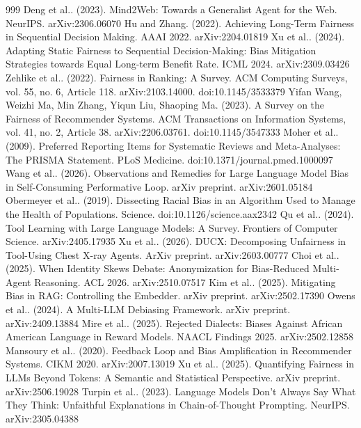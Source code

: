 \documentclass[10pt]{article}
\begin{document}
\begin{thebibliography}{999}
 Deng et al.. (2023). Mind2Web: Towards a Generalist Agent for the Web. NeurIPS. arXiv:2306.06070
 Hu and Zhang. (2022). Achieving Long-Term Fairness in Sequential Decision Making. AAAI 2022. arXiv:2204.01819
 Xu et al.. (2024). Adapting Static Fairness to Sequential Decision-Making: Bias Mitigation Strategies towards Equal Long-term Benefit Rate. ICML 2024. arXiv:2309.03426
 Zehlike et al.. (2022). Fairness in Ranking: A Survey. ACM Computing Surveys, vol. 55, no. 6, Article 118. arXiv:2103.14000. doi:10.1145/3533379
 Yifan Wang, Weizhi Ma, Min Zhang, Yiqun Liu, Shaoping Ma. (2023). A Survey on the Fairness of Recommender Systems. ACM Transactions on Information Systems, vol. 41, no. 2, Article 38. arXiv:2206.03761. doi:10.1145/3547333
 Moher et al.. (2009). Preferred Reporting Items for Systematic Reviews and Meta-Analyses: The PRISMA Statement. PLoS Medicine. doi:10.1371/journal.pmed.1000097
 Wang et al.. (2026). Observations and Remedies for Large Language Model Bias in Self-Consuming Performative Loop. arXiv preprint. arXiv:2601.05184
 Obermeyer et al.. (2019). Dissecting Racial Bias in an Algorithm Used to Manage the Health of Populations. Science. doi:10.1126/science.aax2342
 Qu et al.. (2024). Tool Learning with Large Language Models: A Survey. Frontiers of Computer Science. arXiv:2405.17935
 Xu et al.. (2026). DUCX: Decomposing Unfairness in Tool-Using Chest X-ray Agents. ArXiv preprint. arXiv:2603.00777
 Choi et al.. (2025). When Identity Skews Debate: Anonymization for Bias-Reduced Multi-Agent Reasoning. ACL 2026. arXiv:2510.07517
 Kim et al.. (2025). Mitigating Bias in RAG: Controlling the Embedder. arXiv preprint. arXiv:2502.17390
 Owens et al.. (2024). A Multi-LLM Debiasing Framework. arXiv preprint. arXiv:2409.13884
 Mire et al.. (2025). Rejected Dialects: Biases Against African American Language in Reward Models. NAACL Findings 2025. arXiv:2502.12858
 Mansoury et al.. (2020). Feedback Loop and Bias Amplification in Recommender Systems. CIKM 2020. arXiv:2007.13019
 Xu et al.. (2025). Quantifying Fairness in LLMs Beyond Tokens: A Semantic and Statistical Perspective. arXiv preprint. arXiv:2506.19028
 Turpin et al.. (2023). Language Models Don't Always Say What They Think: Unfaithful Explanations in Chain-of-Thought Prompting. NeurIPS. arXiv:2305.04388

\end{thebibliography}
\end{document}
